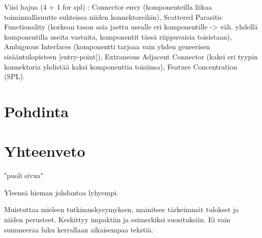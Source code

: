 \documentclass[finnish]{tktltiki2}
\theoremstyle{definition}
\theoremstyle{remark}
\begin{document}
Viisi hajua (4 + 1 for spl) \citep{garcia_toward_2009}: Connector envy (komponenteilla liikaa toiminnallisuutte suhteissa niiden konnektoreihin), Scattered Parasitic Functionality (korkean tason asia jaettu usealle eri komponentille -> väh. yhdellä komponentilla useita vastuita, komponentit tässä riippuvaisia toisistaan), Ambiguous Interfaces (komponentti tarjoaa vain yhden geneerisen sisääntulopisteen [entry-point]), Extraneous Adjacent Connector (kaksi eri tyypin konnektoria yhdistää kaksi komponenttia toisiinsa), Feature Concentration (SPL). 



\section{Pohdinta}

\section{Yhteenveto}
"puoli sivua"

Yleensä hieman johdantoa lyhyempi.

Muistuttaa mieleen tutkimuskysymyksen, mainitsee tärkeimmät tulokset ja niiden perusteet. Keskittyy impaktiin ja esimerkiksi suosituksiin. Ei vain summeeraa luku kerrallaan aikaisempaa tekstiä.



%
%
% 
%

%






% 
\end{document}
